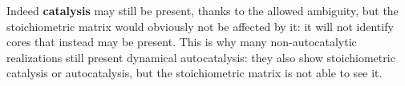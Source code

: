 \documentclass{article}
\begin{document}

Indeed \textbf{catalysis} may still be present, thanks to the allowed ambiguity, but the stoichiometric matrix would obviously not be affected by it: it will not identify cores that instead may be present. This is why many non-autocatalytic realizations still present dynamical autocatalysis: they also show stoichiometric catalysis or autocatalysis, but the stoichiometric matrix is not able to see it.
\end{document}
